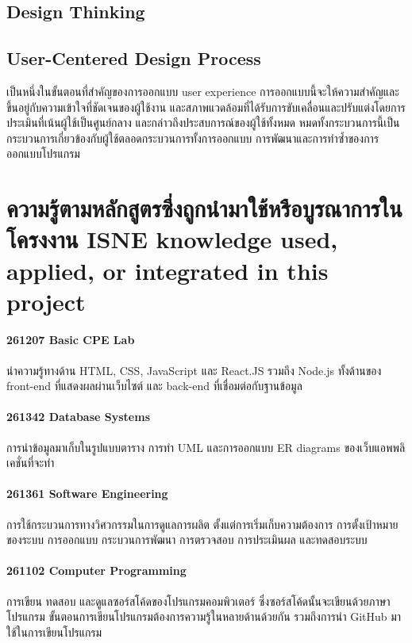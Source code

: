 \subsection*{Design Thinking}

\subsection*{User-Centered Design Process}
เป็นหนึ่งในขั้นตอนที่สำคัญของการออกแบบ user experience การออกแบบนี้จะให้ความสำคัญและขึ้นอยู่กับความเข้าใจที่ชัดเจนของผู้ใช้งาน และสภาพแวดล้อมที่ได้รับการขับเคลื่อนและปรับแต่งโดยการประเมินที่เน้นผู้ใช้เป็นศูนย์กลาง และกล่าวถึงประสบการณ์ของผู้ใช้ทั้งหมด หมดทั้งกระบวนการนี้เป็น กระบวนการเกี่ยวข้องกับผู้ใช้ตลอดกระบวนการทั้งการออกแบบ การพัฒนาและการทำซ้ำของการออกแบบโปรแกรม


\section{\ifcpe%
ความรู้ตามหลักสูตรซึ่งถูกนำมาใช้หรือบูรณาการในโครงงาน
\else%
ISNE knowledge used, applied, or integrated in this project
\fi
}
\paragraph{261207 Basic CPE Lab}
นำความรู้ทางด้าน HTML, CSS, JavaScript และ React.JS รวมถึง Node.js 
ทั้งด้านของ front-end ที่แสดงผลผ่านเว็บไซต์ และ back-end ที่เชื่อมต่อกับฐานข้อมูล

\paragraph{261342 Database Systems}
การนำข้อมูลมาเก็บในรูปแบบตาราง การทำ UML และการออกแบบ ER diagrams ของเว็บแอพพลิเคชั่นที่จะทำ

\paragraph{261361 Software Engineering}
การใช้กระบวนการทางวิศวกรรมในการดูแลการผลิต ตั้งแต่การเริ่มเก็บความต้องการ การตั้งเป้าหมายของระบบ 
การออกแบบ กระบวนการพัฒนา การตรวจสอบ การประเมินผล และทดสอบระบบ

\paragraph{261102 Computer Programming}
การเขียน ทดสอบ และดูแลซอร์สโค้ดของโปรแกรมคอมพิวเตอร์ ซึ่งซอร์สโค้ดนั้นจะเขียนด้วยภาษาโปรแกรม 
ขั้นตอนการเขียนโปรแกรมต้องการความรู้ในหลายด้านด้วยกัน รวมถึงการนำ GitHub มาใช้ในการเขียนโปรแกรม

